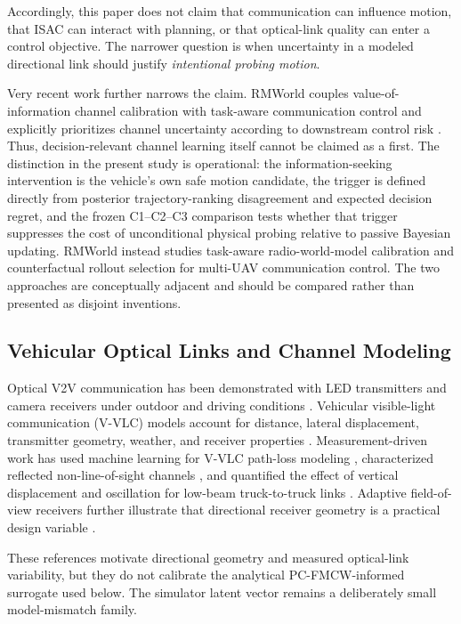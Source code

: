 \documentclass[journal]{IEEEtran}
\begin{document}
Accordingly, this paper does not claim that communication can influence motion, that ISAC can interact with planning, or that optical-link quality can enter a control objective. The narrower question is when uncertainty in a modeled directional link should justify \emph{intentional probing motion}.

Very recent work further narrows the claim. RMWorld couples value-of-information channel calibration with task-aware communication control and explicitly prioritizes channel uncertainty according to downstream control risk \cite{wang2026rmworld}. Thus, decision-relevant channel learning itself cannot be claimed as a first. The distinction in the present study is operational: the information-seeking intervention is the vehicle's own safe motion candidate, the trigger is defined directly from posterior trajectory-ranking disagreement and expected decision regret, and the frozen C1--C2--C3 comparison tests whether that trigger suppresses the cost of unconditional physical probing relative to passive Bayesian updating. RMWorld instead studies task-aware radio-world-model calibration and counterfactual rollout selection for multi-UAV communication control. The two approaches are conceptually adjacent and should be compared rather than presented as disjoint inventions.

\subsection{Vehicular Optical Links and Channel Modeling}
Optical V2V communication has been demonstrated with LED transmitters and camera receivers under outdoor and driving conditions \cite{takai2014}. Vehicular visible-light communication (V-VLC) models account for distance, lateral displacement, transmitter geometry, weather, and receiver properties \cite{karbalayghareh2020}. Measurement-driven work has used machine learning for V-VLC path-loss modeling \cite{turan2021}, characterized reflected non-line-of-sight channels \cite{turan2022nlos}, and quantified the effect of vertical displacement and oscillation for low-beam truck-to-truck links \cite{mohamed2023}. Adaptive field-of-view receivers further illustrate that directional receiver geometry is a practical design variable \cite{cailean2024}.

These references motivate directional geometry and measured optical-link variability, but they do not calibrate the analytical PC-FMCW-informed surrogate used below. The simulator latent vector remains a deliberately small model-mismatch family.
\end{document}
